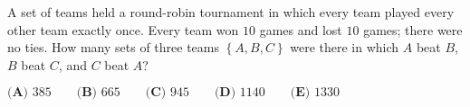 A set of teams held a round-robin tournament in which every team played every other team exactly once. Every team won $10$ games and lost $10$ games; there were no ties. How many sets of three teams $\left\{A,B,C\right\}$ were there in which $A$ beat $B$, $B$ beat $C$, and $C$ beat $A$?

$\textbf{(A) }385\qquad\textbf{(B) }665\qquad\textbf{(C) }945\qquad\textbf{(D) }1140\qquad\textbf{(E) }1330$